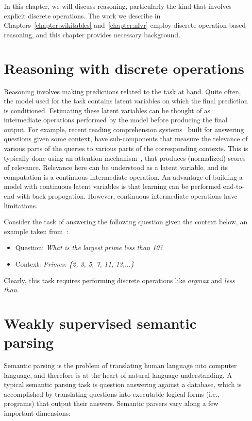 In this chapter, we will discuss reasoning, particularly the kind that involves
explicit discrete operations. The work we describe in
Chapters~\ref{chapter:wikitables} and~\ref{chapter:nlvr} employ discrete
operation based reasoning, and this chapter provides necessary background.

\section{Reasoning with discrete operations}
Reasoning involves making predictions related to the task at hand. Quite often,
the model used for the task contains latent variables on which the final
prediction is conditioned. Estimating these latent variables can be thought of as
intermediate operations performed by the model before producing the final
output. For example, recent reading comprehension systems~\citep[among
others]{Seo2016BidirectionalAF,yu2018qanet} built for answering questions given
some context, have sub-components that measure the relevance of various parts of
the queries to various parts of the corresponding contexts. This is typically
done using an attention mechanism~\citep{bahdanau:14}, that produces
(normalized) scores of relevance. Relevance here can be understood as a latent
variable, and its computation is a continuous intermediate operation. An
advantage of building a model with continuous latent variables is that learning
can be performed end-to-end with back propogation. However, continuous
intermediate operations have limitations.

Consider the task of answering the following question given the context below,
an example taken from~\cite{liang2016learning}:
\begin{itemize}
	\item[] Question: \textit{What is the largest prime less than 10?}
	\item[] Context: \textit{Primes: \{2, 3, 5, 7, 11, 13,$\ldots$\}}
\end{itemize}
Clearly, this task requires performing discrete operations like \textit{argmax}
and \textit{less than}.

\section{Weakly supervised semantic parsing}


Semantic parsing is the problem of translating human language into computer
language, and therefore is at the heart of natural language understanding.  A
typical semantic parsing task is question answering against a database, which
is accomplished by translating questions into executable logical forms (i.e.,
programs) that output their answers. Semantic parsers vary along a few
important dimensions:

